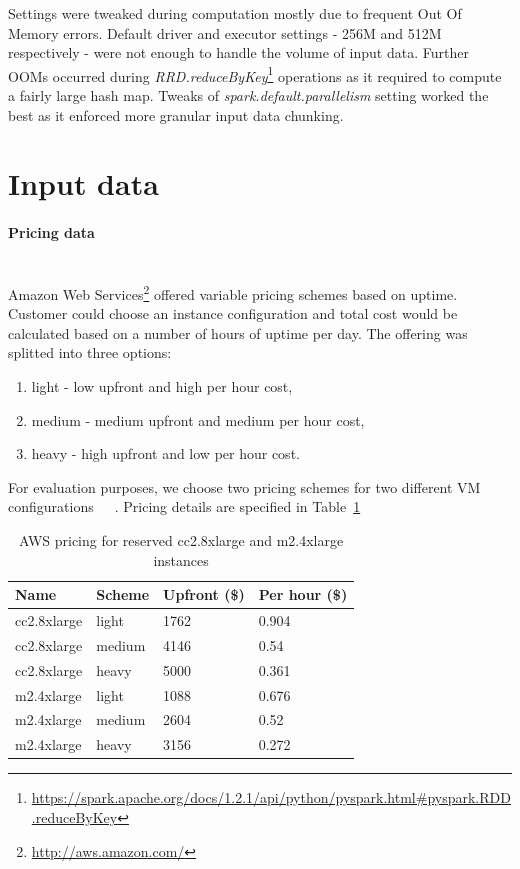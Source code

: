 \documentclass[]{final_report}
\newcommand{\myparagraph}[1]{\paragraph{#1}\mbox{}\\}
\begin{document}
Settings were tweaked during computation mostly due to frequent Out Of Memory errors. Default driver and executor settings - 256M and 512M respectively - were not enough to handle the volume of input data. Further OOMs occurred during \textit{RRD.reduceByKey}\footnote{\url{https://spark.apache.org/docs/1.2.1/api/python/pyspark.html\#pyspark.RDD.reduceByKey}} operations as it required to compute a fairly large hash map. Tweaks of \textit{spark.default.parallelism} setting worked the best as it enforced more granular input data chunking.

\section{Input data}

\myparagraph{Pricing data}

Amazon Web Services\footnote{\url{http://aws.amazon.com/}} offered variable pricing schemes based on uptime. Customer could choose an instance configuration and total cost would be calculated based on a number of hours of uptime per day.
The offering was splitted into three options:
\begin{enumerate}
\item light - low upfront and high per hour cost,
\item medium - medium upfront and medium per hour cost,
\item heavy - high upfront and low per hour cost.
\end{enumerate}

For evaluation purposes, we choose two pricing schemes for two different VM configurations~\cite{AWS:light}~\cite{AWS:medium}~\cite{AWS:heavy}. Pricing details are specified in Table~\ref{tab:aws_pricing}

\begin{table}[h]
\begin{center}
    \begin{tabular}{| l | l | l | l |}
    \hline
    \textbf{Name} & \textbf{Scheme} & \textbf{Upfront (\$)} & \textbf{Per hour (\$)} \\
    \hline
    cc2.8xlarge & light & 1762 & 0.904 \\
    \hline
    cc2.8xlarge & medium & 4146 & 0.54 \\
    \hline
    cc2.8xlarge & heavy & 5000 & 0.361 \\
    \hline
    m2.4xlarge & light & 1088 & 0.676 \\
    \hline
    m2.4xlarge & medium & 2604 & 0.52 \\
    \hline
    m2.4xlarge & heavy & 3156 & 0.272 \\
    \hline
    \end{tabular}
\end{center}
\caption{AWS pricing for reserved cc2.8xlarge and m2.4xlarge instances}
\label{tab:aws_pricing}
\end{table}
\end{document}
